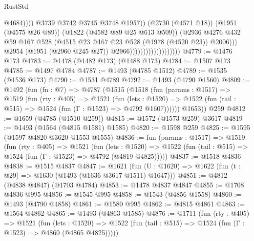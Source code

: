 \begin{lexlean}{RustStd}
\begin{coremodule}
                                                        @4684))))
                                                @3739
                                                @3742
                                                @3745
                                                @3748
                                                @1957))
                                            (@2730 (@4571 @18))
                                            (@1951 (@4575 @26 @89))
                                            (@1822 (@4582 @89 @25 @613 @509))
                                            (@2936
                                              @4276
                                              @432
                                              @59
                                              @167
                                              @528
                                              (@4515 @23 @167 @23 @528 (@1978 (@4520 @23)) @2006)))
                                          @2954
                                          (@1951 (@2960 @245 @27))
                                          @2966)))))))))))))))))))
@4779 := @1476 @173
@4783 := @1478 (@1482 @173) (@1488 @173)
@4784 := @1507 @173
@4785 := @1497 @4784
@4787 := @1493 (@4785 @1512)
@4789 := @1535 (@1536 @173)
@4790 := @1531 @4789
@4792 := @1493 (@4790 @1560)
@4809 := @1492
    (fun (fn : @7) =>
    @4787
      (@1515
        (@1518
          (fun (params : @1517) =>
          @1519
            (fun (rty : @405) =>
            @1521
              (fun (lets : @1520) =>
              @1522 (fun (tail : @515) => @1524 (fun (Γ : @1523) => @4792 @1607))))))
        @1653))
    @259
@4812 := @1659 (@4785 (@1510 @259))
@4815 := @1572 (@1573 @259) @3617
@4819 := @1493 (@1564 (@4815 @1581) @1585)
@4820 := @1598 @259
@4825 := @1595 (@1597 @4820 @3620 @1553 @1555)
@4836 := fun (params : @1517) =>
  @1519
    (fun (rty : @405) =>
    @1521
      (fun (lets : @1520) =>
      @1522 (fun (tail : @515) => @1524 (fun (Γ : @1523) => @4792 (@4819 @4825)))))
@4837 := @1518 @4836
@4838 := @1515 @4837
@4847 := @1621 (fun (U : @1620) => @1622 (fun (t : @29) => @1630 (@1493 (@1636 @3617 @1511) @1647)))
@4851 := @4812 (@4838 @4847) (@1703 @4784)
@4853 := @1478 @4837 @4847
@4855 := @1708 @4836 @995
@4856 := @1545 @995
@4858 := @1543 (@4856 @1558)
@4860 := @1493 (@4790 @4858)
@4861 := @1580 @995
@4862 := @4815 @4861
@4863 := @1564 @4862
@4865 := @1493 (@4863 @1585)
@4876 := @1711
    (fun (rty : @405) =>
    @1521
      (fun (lets : @1520) =>
      @1522 (fun (tail : @515) => @1524 (fun (Γ : @1523) => @4860 (@4865 @4825)))))

\end{coremodule}
\end{lexlean}
